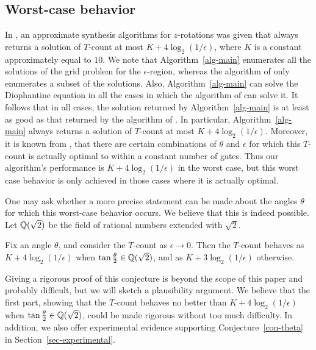 \documentclass{article}
\begin{document}
\subsection{Worst-case behavior}

In {\cite{Selinger-newsynth}}, an approximate synthesis algorithms for
$z$-rotations was given that always returns a solution of $T$-count at
most $K+4\log_2(1/\epsilon)$, where $K$ is a constant approximately
equal to $10$.  We note that Algorithm~\ref{alg-main} enumerates all
the solutions of the grid problem for the $\epsilon$-region, whereas
the algorithm of {\cite{Selinger-newsynth}} only enumerates a subset
of the solutions.  Also, Algorithm~\ref{alg-main} can solve the
Diophantine equation in all the cases in which the algorithm of
{\cite{Selinger-newsynth}} can solve it. It follows that in all cases,
the solution returned by Algorithm~\ref{alg-main} is at least as good
as that returned by the algorithm of {\cite{Selinger-newsynth}}. In
particular, Algorithm~\ref{alg-main} always returns a solution of
$T$-count at most $K+4\log_2(1/\epsilon)$.  Moreover, it is known from
{\cite[Section 9]{Selinger-newsynth}}, that there are certain
combinations of $\theta$ and $\epsilon$ for which this $T$-count is
actually optimal to within a constant number of gates. Thus our
algorithm's performance is $K+4\log_2(1/\epsilon)$ in the worst case,
but this worst case behavior is only achieved in those cases where it
is actually optimal.

One may ask whether a more precise statement can be made about the
angles $\theta$ for which this worst-case behavior occurs. We believe
that this is indeed possible. Let ${\mathbb{Q}}(\sqrt 2)$ be the field of
rational numbers extended with $\sqrt 2$.

\begin{conjecture}\label{con-theta}
  Fix an angle $\theta$, and consider the $T$-count as
  $\epsilon\to 0$. Then the $T$-count behaves as
  $K+4\log_2(1/\epsilon)$ when $\tan\frac{\theta}{2}\in {\mathbb{Q}}(\sqrt 2)$,
  and as $K+3\log_2(1/\epsilon)$ otherwise.
\end{conjecture}

Giving a rigorous proof of this conjecture is beyond the scope of this
paper and probably difficult, but we will sketch a plausibility
argument. We believe that the first part, showing that the $T$-count
behaves no better than $K+4\log_2(1/\epsilon)$ when
$\tan\frac{\theta}{2}\in {\mathbb{Q}}(\sqrt 2)$, could be made rigorous without
too much difficulty. In addition, we also offer experimental evidence
supporting Conjecture~\ref{con-theta} in
Section~\ref{sec-experimental}.
\end{document}
